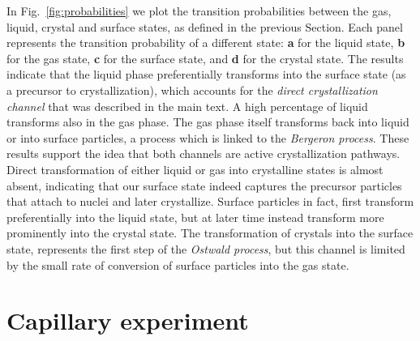 In Fig.~\ref{fig:probabilities} we plot the transition probabilities between the gas, liquid, crystal
and surface states, as defined in the previous Section. Each panel represents the transition probability
of a different state: {\bf a} for the liquid state, {\bf b} for the gas state, {\bf c} for the surface state,
and {\bf d} for the crystal state. The results indicate that the liquid phase preferentially transforms into
the surface state (as a precursor to crystallization), which accounts for the \emph{direct crystallization channel}
that was described in the main text. A high percentage of liquid transforms also in the gas phase. The gas phase itself
transforms back into liquid or into surface particles, a process which
is linked to the \emph{Bergeron process}. These results support the idea that both channels are active
crystallization pathways. Direct transformation of either liquid or gas into crystalline states is almost absent,
indicating that our surface state indeed captures the precursor particles that attach to nuclei and later crystallize.
Surface particles in fact, first transform preferentially into the liquid state, but at later time instead transform
more prominently into the crystal state. The transformation of crystals into the surface state, represents the first
step of the \emph{Ostwald process}, but this channel is limited by the small rate of conversion of surface particles
into the gas state.

\section*{Capillary experiment}


